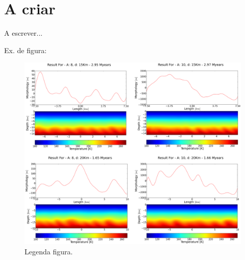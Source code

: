 \chapter{A criar}

A escrever...

Ex. de figura:

\begin{figure}[H]
\center
\includegraphics[scale=0.39]{img/allll.png}
\caption {Legenda figura.} 
\label{antenna}
\end{figure}


